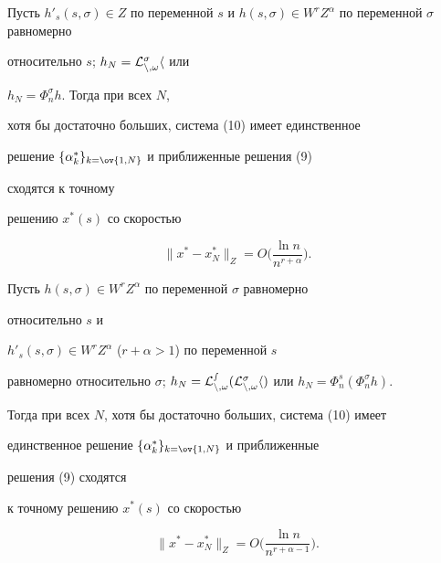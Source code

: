  


\begin{cor} 


Пусть $h'_s(s,\sigma)\in Z$ по переменной $s$ и $h(s,\sigma)\in W^r 


Z^\alpha$ по переменной $\sigma$ равномерно 


относительно $s$; $h_N=\cal L^\sigma_{n,\omega}h$ или 


$h_N=\Phi^\sigma_n h$. Тогда при всех $N$, 


хотя бы достаточно больших, система (10) имеет единственное 


решение $\{\alpha^*_k\}_{k=\ov{1,N}}$ и приближенные решения (9) 


сходятся к точному 


решению $x^*(s)$ со скоростью 


$$ 


\|x^*-x^*_N\|_Z=O\bigg(\frac{\ln n}{n^{r+\alpha}} \bigg). 


$$ 


\end{cor} 


 


\begin{cor} 


Пусть $h(s,\sigma)\in W^r Z^\alpha$ по переменной $\sigma$ равномерно 


относительно $s$ и\linebreak


$h'_s(s,\sigma)\in W^r Z^\alpha$ ($r+\alpha>1$) по переменной $s$ 


равномерно относительно $\sigma$; $h_N=\cal L^s_{n,\omega}(\cal 


L^\sigma_{n,\omega}h)$ или $h_N=\Phi^s_n(\Phi^\sigma_n h)$. 


Тогда при всех $N$, хотя бы достаточно больших, система (10) имеет 


единственное решение $\{\alpha^*_k\}_{k=\ov{1,N}}$ и приближенные 


решения (9) сходятся 


к точному решению $x^*(s)$ со скоростью 


$$ 


\|x^*-x^*_N\|_Z=O\bigg(\frac{\ln n}{n^{r+\alpha-1}} \bigg). 


$$ 


\end{cor} 


 


